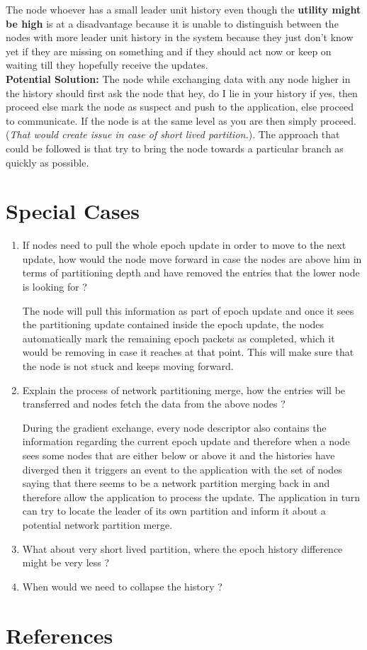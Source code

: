 \documentclass[a4paper, 11pt]{article}
\begin{document}
The node whoever has a small leader unit history even though the \textbf{utility might be high} is at a disadvantage because it is unable to distinguish between the nodes with more leader unit history in the system because they just don't know yet if they are missing on something and if they should act now or keep on waiting till they hopefully receive the updates.\\

\textbf{Potential Solution:} The node while exchanging data with any node higher in the history should first ask the node that hey, do I lie in your history if yes, then proceed else mark the node as suspect and push to the application, else proceed to communicate. If the node is at the same level as you are then simply proceed. 
(\textit{That would create issue in case of short lived partition.}). The approach that could be followed is that try to bring the node towards a particular branch as quickly as possible. 




\section{Special Cases}


\begin{enumerate}

\item If nodes need to pull the whole epoch update in order to move to the next update, how would the node move forward in case the nodes are above him in terms of partitioning depth and have removed the entries that the lower node is looking for ?

The node will pull this information as part of epoch update and once it sees the partitioning update contained inside the epoch update, the nodes automatically mark the remaining epoch packets as completed, which it would be removing in case it reaches at that point. This will make sure that the node is not stuck and keeps moving forward.


\item Explain the process of network partitioning merge, how the entries will  be transferred and nodes fetch the data from the above nodes ?

During the gradient exchange, every node descriptor also contains the information regarding the current epoch update and therefore when a node sees some nodes that are either below or above it and the histories have diverged then it triggers an event to the application with the set of nodes saying that there seems to be a network partition merging back in and therefore allow the application to process the update. The application in turn can try to locate the leader of its own partition and inform it about a potential network partition merge.


\item What about very short lived partition, where the epoch history difference might be very less ?

\item When would we need to collapse the history ?

\end{enumerate}


\section{References}
\end{document}
